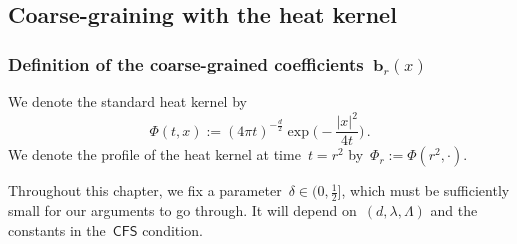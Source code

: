 \documentclass[11pt,twoside]{article} %
\numberwithin{equation}{section}
\theoremstyle{definition}
\renewcommand{\b}{\ensuremath{\mathbf{b}}}
\newcommand{\CFS}{\mathsf{CFS}}
\begin{document}
\subsection{Coarse-graining with the heat kernel}

\subsubsection{Definition of the coarse-grained coefficients~$\b_r(x)$}
\label{ss.coarsegrain.with.tempo}
We denote the standard heat kernel by 
\begin{equation*}
\Phi(t,x) := (4\pi t)^{-\frac d2} \exp\biggl( -\frac{|x|^2}{4t} \biggr)\,.
\end{equation*}
We denote the profile of the heat kernel at time~$t=r^2$ by~$\Phi_r:= \Phi(r^2,\cdot)$.

\smallskip

Throughout this chapter, we fix a parameter~$\delta\in (0,\frac12]$, which must be sufficiently small for our arguments to go through. It will depend on~$(d,\lambda,\Lambda)$ and the constants in the~$\CFS$ condition. 

\smallskip
\end{document}
